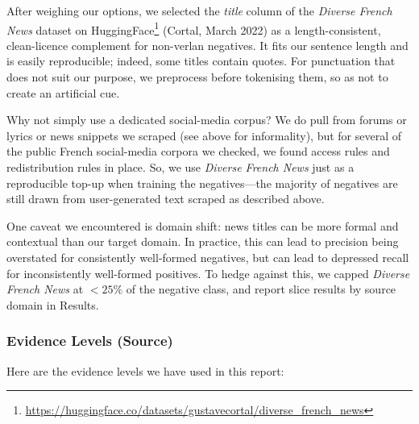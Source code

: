 \documentclass[12pt]{article}
\begin{document}
After weighing our options, we selected the \textit{title} column of the \textit{Diverse French News} dataset on HuggingFace\footnote{\url{https://huggingface.co/datasets/gustavecortal/diverse_french_news}} (Cortal, March 2022) as a length-consistent, clean-licence complement for non-verlan negatives. It fits our sentence length and is easily reproducible; indeed, some titles contain quotes. For punctuation that does not suit our purpose, we preprocess before tokenising them, so as not to create an artificial cue.

Why not simply use a dedicated social-media corpus? We do pull from forums or lyrics or news snippets we scraped (see above for informality), but for several of the public French social-media corpora we checked, we found access rules and redistribution rules in place. So, we use \textit{Diverse French News} just as a reproducible top-up when training the negatives\;---\;the majority of negatives are still drawn from user-generated text scraped as described above.

One caveat we encountered is domain shift: news titles can be more formal and contextual than our target domain. In practice, this can lead to precision being overstated for consistently well-formed negatives, but can lead to depressed recall for inconsistently well-formed positives. To hedge against this, we capped \textit{Diverse French News} at \(<25\%\) of the negative class, and report slice results by source domain in Results.

\subsubsection{Evidence Levels (Source)}

Here are the evidence levels we have used in this report:

\begin{table}[H]
\centering
\caption{Evidence levels applied across the verlan dataset.}
\label{tab:verlan_tiers}
\end{table}
\end{document}
